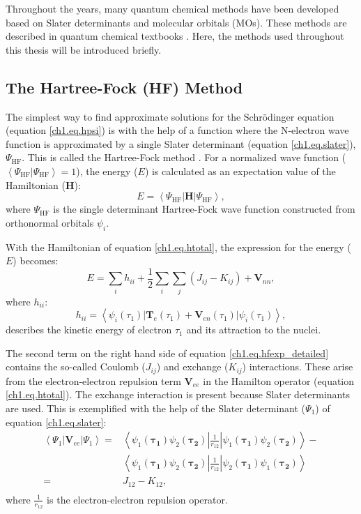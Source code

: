 Throughout the years, many quantum chemical methods have been developed based on Slater determinants and molecular orbitals (MOs). These methods are described in quantum chemical textbooks \cite{szabo}. Here, the methods used throughout this thesis will be introduced briefly.

\subsection{The Hartree-Fock (HF) Method}
The simplest way to find approximate solutions for the Schr\"{o}dinger equation (equation \ref{ch1.eq.hpsi}) is with the help of a function where the N-electron wave function is approximated by a single Slater determinant (equation \ref{ch1.eq.slater}), $\Psi_\mathrm{HF}$. This is called the Hartree-Fock method \cite{hartree1,hartree2,hartree3,fock}. For a normalized wave function ($\left< \Psi_\mathrm{HF} | \Psi_\mathrm{HF} \right> = 1$), the energy ($E$) is calculated as an expectation value of the Hamiltonian ($\mathbf{H}$):
\begin{equation}
E=\left< \Psi_\mathrm{HF} | \mathbf{H} | \Psi_\mathrm{HF} \right>,
\label{ch1.eq.hfexp}
\end{equation}
where $\Psi_\mathrm{HF}$ is the single determinant Hartree-Fock wave function constructed from orthonormal orbitals $\psi_i$.

With the Hamiltonian of equation \ref{ch1.eq.htotal}, the expression for the energy ($E$) becomes:
\begin{equation}
E=\sum_i h_{ii} + \frac{1}{2} \sum_i\sum_j (J_{ij} - K_{ij}) + \mathbf{V}_{nn},
\label{ch1.eq.hfexp_detailed}
\end{equation}
where $h_{ii}$:
\begin{equation}
h_{ii} = \left< \psi_i(\tau_1) | \mathbf{T}_{e}(\tau_1) + \mathbf{V}_{en}(\tau_1) | \psi_i(\tau_1)\right>,
\end{equation}
describes the kinetic energy of electron $\tau_1$ and its attraction to the nuclei.

The second term on the right hand side of equation \ref{ch1.eq.hfexp_detailed} contains the so-called Coulomb ($J_{ij}$) and exchange ($K_{ij}$) interactions. These arise from the electron-electron repulsion term $\mathbf{V}_{ee}$ in the Hamilton operator (equation \ref{ch1.eq.htotal}). The exchange interaction is present because Slater determinants are used. This is exemplified with the help of the Slater determinant ($\Psi_1$) of equation \ref{ch1.eq.slater}:
\begin{equation}
\begin{split}
\left< \Psi_1 | \mathbf{V}_{ee} | \Psi_1 \right> = & \left< \psi_1(\mathbf{\tau_1})\psi_2(\mathbf{\tau_2}) | \frac{1}{r_{12}} | \psi_1(\mathbf{\tau_1})\psi_2(\mathbf{\tau_2}) \right> - \\
& \left< \psi_1(\mathbf{\tau_1})\psi_2(\mathbf{\tau_2}) | \frac{1}{r_{12}} | \psi_2(\mathbf{\tau_1})\psi_1(\mathbf{\tau_2}) \right> \\
= & J_{12} - K_{12}, \\
\end{split}
\end{equation}
where $\frac{1}{r_{12}}$ is the electron-electron repulsion operator.

